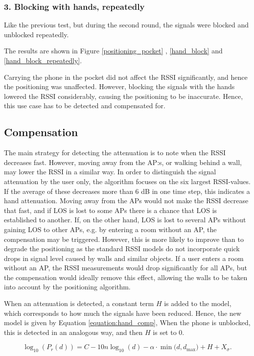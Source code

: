 \documentclass{LTHthesis}
\begin{document}
\subsubsection{3. Blocking with hands, repeatedly}
Like the previous test, but during the second round, the signals were blocked and unblocked repeatedly. 

The results are shown in Figure \ref{positioning_pocket} , \ref{hand_block} and \ref{hand_block_repeatedly}.


%
Carrying the phone in the pocket did not affect the RSSI significantly, and hence the positioning was unaffected. However, blocking the signals with the hands lowered the RSSI considerably, causing the positioning to be inaccurate. Hence, this use case has to be detected and compensated for.

\subsection{Compensation}

The main strategy for detecting the attenuation is to note when the RSSI decreases fast. However, moving away from the AP:s, or walking behind a wall, may lower the RSSI in a similar way. In order to distinguish the signal attenuation by the user only, the algorithm focuses on the six largest RSSI-values. If the average of these decreases more than 6 dB in one time step, this indicates a hand attenuation. Moving away from the APs would not make the RSSI decrease that fast, and if LOS is lost to some APs there is a chance that LOS is established to another. If, on the other hand, LOS is lost to several APs without gaining LOS to other APs, e.g. by entering a room without an AP, the compensation may be triggered. However, this is more likely to improve than to degrade the positioning as the standard RSSI models do not incorporate quick drops in signal level caused by walls and similar objects. If a user enters a room without an AP, the RSSI measurements would drop significantly for all APs, but the compensation would ideally remove this effect, allowing the walls to be taken into account by the positioning algorithm. 

When an attenuation is detected, a constant term $H$ is added to the model, which corresponds to how much the signals have been reduced. Hence, the new model is given by Equation \ref{equation:hand_comp},  When the phone is unblocked, this is detected in an analogous way, and then $H$ is set to 0. 

\begin{equation}
\log_{10}({P_r(d)})=C-10n\log_{10}(d) - \alpha\cdot\min({d, d_{\text{max}})}+H+ X_\sigma.
\label{equation:hand_comp}
\end{equation}
\end{document}
